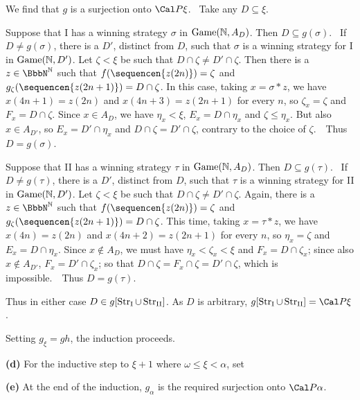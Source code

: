 {


We find that $g$ is a surjection onto $\Cal P\xi$.   \Prf\ Take any
$D\subseteq\xi$.

\medskip

Suppose that I has a winning strategy $\sigma$ in $\Game(\Bbb N,A_D)$.
Then $D\subseteq g(\sigma)$.   \Quer\ If $D\ne g(\sigma)$, there is a $D'$,
distinct from $D$, such that $\sigma$ is a winning strategy for I in
$\Game(\Bbb N,D')$.   Let $\zeta<\xi$ be such that
$D\cap\zeta\ne D'\cap\zeta$.   Then there is
a $z\in\NN$ such that $f(\sequencen{z(2n)})=\zeta$ and
$g_{\zeta}(\sequencen{z(2n+1)})=D\cap\zeta$.   In this case, taking
$x=\sigma*z$, we have $x(4n+1)=z(2n)$ and $x(4n+3)=z(2n+1)$ for every $n$,
so $\zeta_x=\zeta$ and $F_x=D\cap\zeta$.   Since $x\in A_D$,
we have $\eta_x<\xi$, $E_x=D\cap\eta_x$ and $\zeta\le\eta_x$.
But also $x\in A_{D'}$, so $E_x=D'\cap\eta_x$ and $D\cap\zeta=D'\cap\zeta$,
contrary to the choice of $\zeta$.\ \BanG\   Thus $D=g(\sigma)$.

\medskip

Suppose that II has a winning strategy $\tau$ in $\Game(\Bbb N,A_D)$.
Then $D\subseteq g(\tau)$.   \Quer\ If $D\ne g(\tau)$, there is a $D'$,
distinct from $D$, such that $\tau$ is a winning strategy for II in
$\Game(\Bbb N,D')$.   Let $\zeta<\xi$ be such that
$D\cap\zeta\ne D'\cap\zeta$.   Again, there is
a $z\in\NN$ such that $f(\sequencen{z(2n)})=\zeta$ and
$g_{\zeta}(\sequencen{z(2n+1)})=D\cap\zeta$.   This time, taking
$x=\tau*z$, we have $x(4n)=z(2n)$ and $x(4n+2)=z(2n+1)$ for every $n$,
so $\eta_x=\zeta$ and $E_x=D\cap\eta_x$.   Since $x\notin A_D$, we must
have $\eta_x<\zeta_x<\xi$ and $F_x=D\cap\zeta_x$;  since also
$x\notin A_{D'}$, $F_x=D'\cap\zeta_x$;  so that
$D\cap\zeta=F_x\cap\zeta=D'\cap\zeta$, which is impossible.\ \BanG\
Thus $D=g(\tau)$.

\medskip

Thus in either case $D\in g[\StrI\cup\StrII]$.   As $D$ is arbitrary,
$g[\StrI\cup\StrII]=\Cal P\xi$.\ \Qed\

Setting $g_{\xi}=gh$, the induction proceeds.

\medskip

{\bf (d)} For the inductive step to $\xi+1$ where $\omega\le\xi<\alpha$,
set



\medskip

{\bf (e)} At the end of the induction, $g_{\alpha}$
is the required surjection onto $\Cal P\alpha$.
}%


